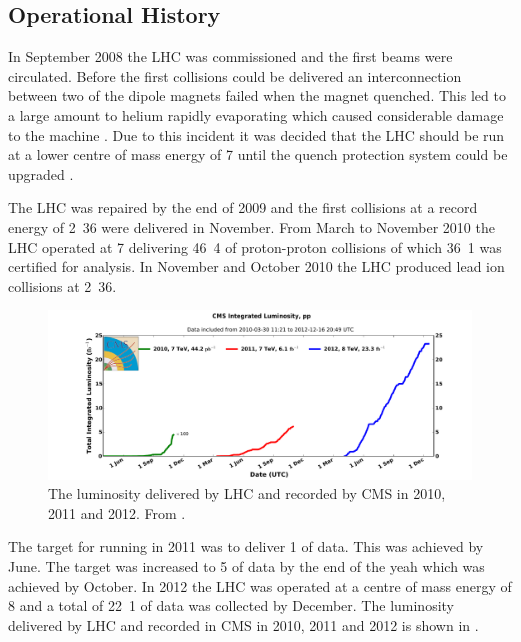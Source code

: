 \subsection{Operational History}
In September 2008 the {LHC} was commissioned and the first beams were
circulated.  Before the first collisions could be delivered an interconnection
between two of the dipole magnets failed when the magnet quenched.  This led to
a large amount to helium rapidly evaporating which caused considerable damage to
the machine \cite{lebrun2009sector}.  Due to this incident it was decided that
the {LHC} should be run at a lower centre of mass energy of \unit{7}{\TeV} until
the quench protection system could be upgraded \cite{myers2010lhc}.

The {LHC} was repaired by the end of 2009 and the first collisions at a record
energy of \unit{2.36}{\TeV} were delivered in November.  From March to November
2010 the {LHC} operated at \unit{7}{\TeV} delivering \unit{46.4}{\invpb} of
proton-proton collisions of which \unit{36.1}{\invpb} was certified for
analysis.  In November and October 2010 the {LHC} produced lead ion collisions
at \unit{2.36}{\TeV}.

\begin{figure}[htbp]
  \centering
  \includegraphics[width=\textwidth]{int_lumi_cumulative_pp_1.pdf}
  \caption{The luminosity delivered by LHC and recorded by CMS in 2010, 2011 and
2012. From \cite{intlumi}.}
  \label{fig:LHC2010}
\end{figure}

The target for running in 2011 was to deliver \unit{1}{\invfb} of data. This was
achieved by June. The target was increased to \unit{5}{\invfb} of data by the end
of the yeah which was achieved by October. 
In 2012 the {LHC} was operated at a centre of mass energy of \unit{8}{\TeV}
and a total of \unit{22.1}{\invfb} of data was collected by December.
The luminosity delivered by LHC and recorded in CMS in 2010, 2011 and 2012 is
shown in  \cite{intlumi}.

